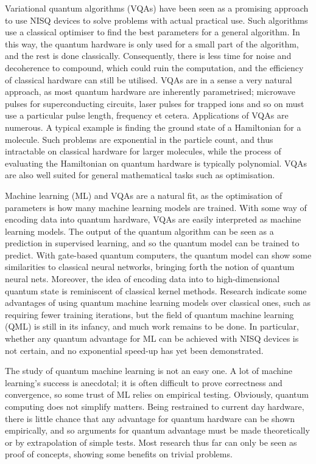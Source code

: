 Variational quantum algorithms (VQAs) have been seen as a promising approach to use NISQ devices to solve problems with actual practical use.
Such algorithms use a classical optimiser to find the best parameters for a general algorithm.
In this way, the quantum hardware is only used for a small part of the algorithm, and the rest is done classically.
Consequently, there is less time for noise and decoherence to compound, which could ruin the computation, and the efficiency of classical hardware can still be utilised.
VQAs are in a sense a very natural approach, as most quantum hardware are inherently parametrised; microwave pulses for superconducting circuits, laser pulses for trapped ions and so on must use a particular pulse length, frequency et cetera.
Applications of VQAs are numerous.
A typical example is finding the ground state of a Hamiltonian for a molecule.
Such problems are exponential in the particle count, and thus intractable on classical hardware for larger molecules, while the process of evaluating the Hamiltonian on quantum hardware is typically polynomial.
VQAs are also well suited for general mathematical tasks such as optimisation.

Machine learning (ML) and VQAs are a natural fit, as the optimisation of parameters is how many machine learning models are trained.
With some way of encoding data into quantum hardware, VQAs are easily interpreted as machine learning models.
The output of the quantum algorithm can be seen as a prediction in supervised learning, and so the quantum model can be trained to predict.
With gate-based quantum computers, the quantum model can show some similarities to classical neural networks, bringing forth the notion of quantum neural nets.
Moreover, the idea of encoding data into to high-dimensional quantum state is reminiscent of classical kernel methods.
Research indicate some advantages of using quantum machine learning models over classical ones, such as requiring fewer training iterations, but the field of quantum machine learning (QML) is still in its infancy, and much work remains to be done.
In particular, whether any quantum advantage for ML can be achieved with NISQ devices is not certain, and no exponential speed-up has yet been demonstrated.

The study of quantum machine learning is not an easy one.
A lot of machine learning's success is anecdotal; it is often difficult to prove correctness and convergence, so some trust of ML relies on empirical testing.
Obviously, quantum computing does not simplify matters.
Being restrained to current day hardware, there is little chance that any advantage for quantum hardware can be shown empirically, and so arguments for quantum advantage must be made theoretically or by extrapolation of simple tests.
Most research thus far can only be seen as proof of concepts, showing some benefits on trivial problems.

